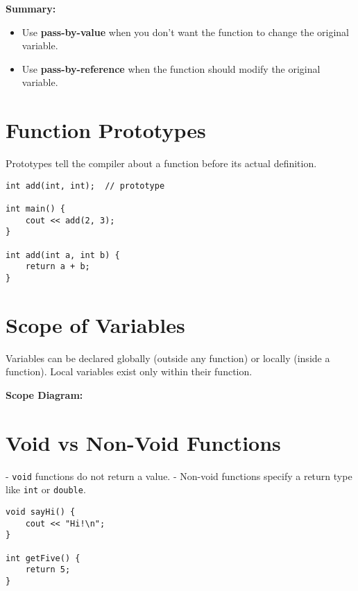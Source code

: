 \documentclass{article}
\begin{document}
\textbf{Summary:}
\begin{itemize}
    \item Use \textbf{pass-by-value} when you don't want the function to change the original variable.
    \item Use \textbf{pass-by-reference} when the function should modify the original variable.
\end{itemize}

\section{Function Prototypes}

Prototypes tell the compiler about a function before its actual definition.

\begin{lstlisting}[style=cppstyle]
int add(int, int);  // prototype

int main() {
    cout << add(2, 3);
}

int add(int a, int b) {
    return a + b;
}
\end{lstlisting}

\section{Scope of Variables}

Variables can be declared globally (outside any function) or locally (inside a function). Local variables exist only within their function.

\textbf{Scope Diagram:}
\begin{center}
\end{center}

\section{Void vs Non-Void Functions}

- \texttt{void} functions do not return a value.
- Non-void functions specify a return type like \texttt{int} or \texttt{double}.

\begin{lstlisting}[style=cppstyle]
void sayHi() {
    cout << "Hi!\n";
}

int getFive() {
    return 5;
}
\end{lstlisting}
\end{document}
